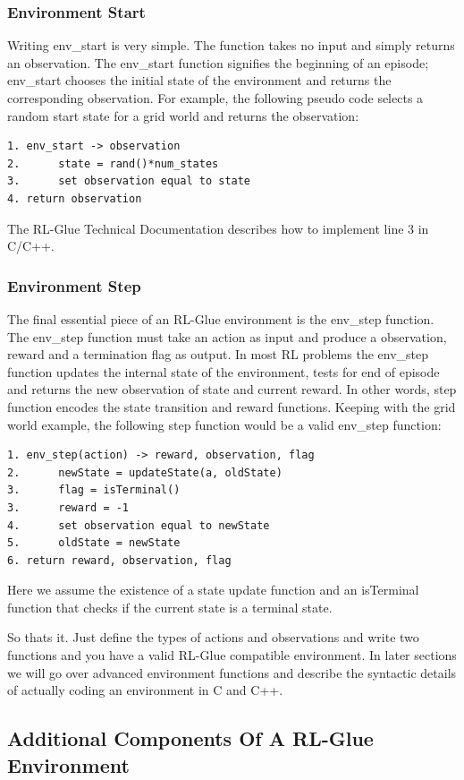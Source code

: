 \documentclass[11pt]{article}
\begin{document}
\subsubsection{Environment Start}
Writing env\_start is very simple. The function takes no input and simply returns an observation. The env\_start function signifies the beginning of an episode; env\_start chooses the initial state of the environment and returns the corresponding observation. For example, the following pseudo code selects a random start state for a grid world and returns the observation:
\begin{verbatim}
1. env_start -> observation
2.      state = rand()*num_states
3.      set observation equal to state
4. return observation
\end{verbatim}
The RL-Glue Technical Documentation describes how to implement line 3 in C/C++.

\subsubsection{Environment Step}
The final essential piece of an RL-Glue environment is the env\_step function. The env\_step function must take an action as input and produce a observation, reward and a termination flag as output. In most RL problems the  env\_step function updates the internal state of the environment, tests for end of episode and returns the new observation of state and current reward. In other words, step function encodes the state transition and reward functions. Keeping with the grid world example, the following step function would be a valid env\_step function:
\begin{verbatim}
1. env_step(action) -> reward, observation, flag 
2.      newState = updateState(a, oldState)
3.      flag = isTerminal()
3.      reward = -1
4.      set observation equal to newState
5.      oldState = newState
6. return reward, observation, flag
\end{verbatim}
Here we assume the existence of a state update function and an isTerminal function that checks if the current state is a terminal state.

So thats it. Just define the types of actions and observations and write two functions and you have a valid RL-Glue compatible environment. In later sections we will go over advanced environment functions and describe the syntactic details of actually coding an environment in C and C++. 

\subsection{Additional Components Of A RL-Glue Environment}
\label{envp2}
\end{document}
